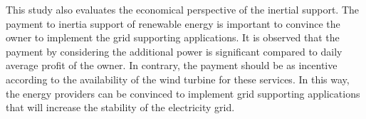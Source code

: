 This study also evaluates the economical perspective of the inertial support. The payment to inertia support of renewable energy is important to convince the owner to implement the grid supporting applications. It is observed that the payment by considering the additional power is significant compared to daily average profit of the owner. In contrary, the payment should be as incentive according to the availability of the wind turbine for these services.  In this way, the energy providers can be convinced to implement grid supporting applications that will increase the stability of the electricity grid.